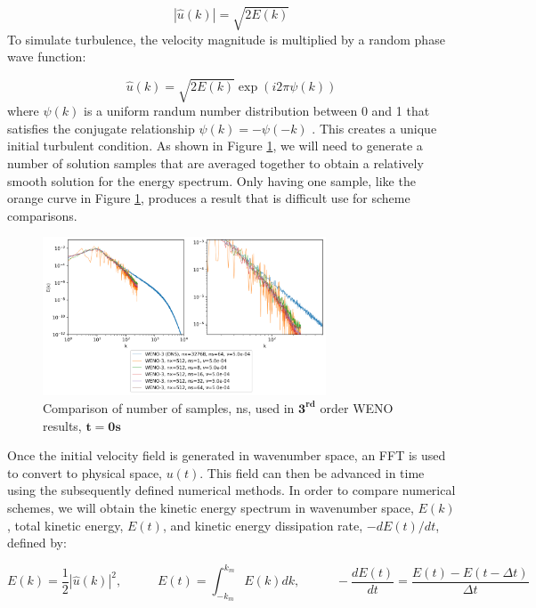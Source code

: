 \documentclass[conf]{new-aiaa}
\begin{document}
\begin{equation}
	|\hat{u}(k)| = \sqrt{2E(k)}
\end{equation}
To simulate turbulence, the velocity magnitude is multiplied by a random phase
wave function:

\begin{equation}
	\hat{u}(k) = \sqrt{2E(k)} \exp(i2\pi \psi(k))
\end{equation}
where $\psi(k)$ is a uniform randum number distribution between 0 and 1 that
satisfies the conjugate relationship $\psi(k) = -\psi(-k)$
\cite{maulik2018explicit}. This creates a unique initial turbulent condition.
As shown in Figure \ref{fig:no_samples}, we will need to generate a number of
solution samples that are averaged together to obtain a relatively smooth
solution for the energy spectrum. Only having one sample, like the orange curve
in Figure \ref{fig:no_samples}, produces a result that is difficult use for
scheme comparisons.

\begin{figure}[hbt!]
	\centering
	\includegraphics[width=0.75\textwidth]{figures/WENO3_No_Samples_Comparison_Ek_vs_k.png}
	\caption{Comparison of number of samples, ns, used in $\mathbf{3^{rd}}$
	order WENO results, $\mathbf{t=0s}$}
	\label{fig:no_samples}
\end{figure}

Once the initial velocity field is generated in wavenumber space, an FFT is
used to convert to physical space, $u(t)$. This field can then be advanced in
time using the subsequently defined numerical methods. In order to compare
numerical schemes, we will obtain the kinetic energy spectrum in wavenumber
space, $E(k)$, total kinetic energy, $E(t)$, and kinetic energy dissipation
rate, $-dE(t)/dt$, defined by:

\begin{equation}
	E(k) = \frac{1}{2} |\hat{u}(k)|^2 \textit{,} \quad \quad \quad
	E(t) = \int_{-k_m}^{k_m} E(k) dk \textit{,} \quad \quad \quad
	-\frac{dE(t)}{dt} = \frac{E(t) - E(t-\Delta t)}{\Delta t}
\end{equation}
\end{document}
